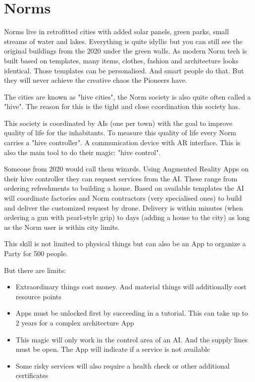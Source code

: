 \section{Norms}
\label{sec:Norms}

Norms live in retrofitted cities with added solar panels, green parks, small streams of water and lakes. Everything is quite idyllic but you can still see the original buildings from the 2020 under the green walls.
As modern Norm tech is built based on templates, many items, clothes, fashion and architecture looks identical. Those templates can be personalised. And smart people do that. But they will never achieve the creative chaos the Pioneers have.

The cities are known as "hive cities", the Norm society is also quite often called a "hive". The reason for this is the tight and close coordination this society has.

This society is coordinated by AIs (one per town) with the goal to improve quality of life for the inhabitants.
To measure this quality of life every Norm carries a "hive controller". A communication device with AR interface. This is also the main tool to do their magic: "hive control".

Someone from 2020 would call them wizards. Using Augmented Reality Apps on their hive controller they can request services from the AI. These range from ordering refreshments to building a house.
Based on available templates the AI will coordinate factories and Norm contractors (very specialised ones) to build and deliver the customized request by drone.
Delivery is within minutes (when ordering a gun with pearl-style grip) to days (adding a house to the city) as long as the Norm user is within city limits.

This skill is not limited to physical things but can also be an App to organize a Party for 500 people.

But there are limits:

\begin{itemize}
    \item Extraordinary things cost money. And material things will additionally cost resource points
    \item Apps must be unlocked first by succeeding in a tutorial. This can take up to 2 years for a complex architecture App
    \item This magic will only work in the control area of an AI. And the supply lines must be open. The App will indicate if a service is not available
    \item Some risky services will also require a health check or other additional certificates
\end{itemize}

